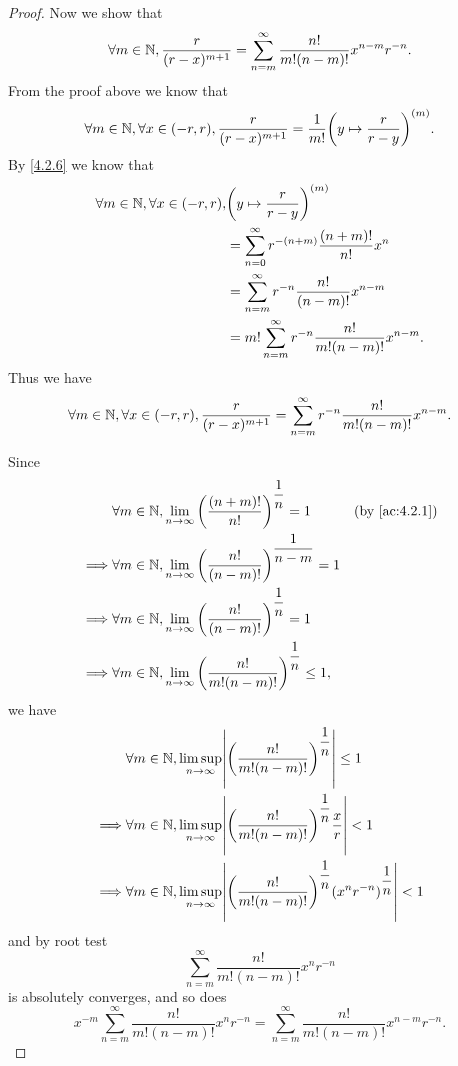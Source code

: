 \begin{proof}
  Now we show that
  \[
    \forall m \in \mathbb{N}, \dfrac{r}{(r - x)^{m + 1}} = \sum_{n = m}^\infty \dfrac{n!}{m! (n - m)!} x^{n - m} r^{-n}.
  \]
  From the proof above we know that
  \[
    \forall m \in \mathbb{N}, \forall x \in (-r, r), \dfrac{r}{(r - x)^{m + 1}} = \dfrac{1}{m!} \bigg(y \mapsto \dfrac{r}{r - y}\bigg)^{(m)}.
  \]
  By \cref{4.2.6} we know that
  \begin{align*}
    \forall m \in \mathbb{N}, \forall x \in (-r, r), & \bigg(y \mapsto \dfrac{r}{r - y}\bigg)^{(m)}                       \\
                                             & = \sum_{n = 0}^\infty r^{-(n + m)} \dfrac{(n + m)!}{n!} x^n        \\
                                             & = \sum_{n = m}^\infty r^{-n} \dfrac{n!}{(n - m)!} x^{n - m}        \\
                                             & = m! \sum_{n = m}^\infty r^{-n} \dfrac{n!}{m! (n - m)!} x^{n - m}.
  \end{align*}
  Thus we have
  \[
    \forall m \in \mathbb{N}, \forall x \in (-r, r), \dfrac{r}{(r - x)^{m + 1}} = \sum_{n = m}^\infty r^{-n} \dfrac{n!}{m! (n - m)!} x^{n - m}.
  \]

  Since
  \begin{align*}
             & \forall m \in \N, \lim_{n \to \infty} \bigg(\dfrac{(n + m)!}{n!}\bigg)^{\dfrac{1}{n}} = 1        &  & \text{(by \cref{ac:4.2.1})} \\
    \implies & \forall m \in \N, \lim_{n \to \infty} \bigg(\dfrac{n!}{(n - m)!}\bigg)^{\dfrac{1}{n - m}} = 1                                     \\
    \implies & \forall m \in \N, \lim_{n \to \infty} \bigg(\dfrac{n!}{(n - m)!}\bigg)^{\dfrac{1}{n}} = 1                                         \\
    \implies & \forall m \in \N, \lim_{n \to \infty} \bigg(\dfrac{n!}{m! (n - m)!}\bigg)^{\dfrac{1}{n}} \leq 1,
  \end{align*}
  we have
  \begin{align*}
             & \forall m \in \N, \limsup_{n \to \infty} \abs{\bigg(\dfrac{n!}{m! (n - m)!}\bigg)^{\dfrac{1}{n}}} \leq 1                          \\
    \implies & \forall m \in \N, \limsup_{n \to \infty} \abs{\bigg(\dfrac{n!}{m! (n - m)!}\bigg)^{\dfrac{1}{n}} \dfrac{x}{r}} < 1                \\
    \implies & \forall m \in \N, \limsup_{n \to \infty} \abs{\bigg(\dfrac{n!}{m! (n - m)!}\bigg)^{\dfrac{1}{n}} (x^n r^{-n})^{\dfrac{1}{n}}} < 1
  \end{align*}
  and by root test
  \[
    \sum_{n = m}^\infty \dfrac{n!}{m! (n - m)!} x^n r^{-n}
  \]
  is absolutely converges, and so does
  \[
    x^{-m} \sum_{n = m}^\infty \dfrac{n!}{m! (n - m)!} x^n r^{-n} = \sum_{n = m}^\infty \dfrac{n!}{m! (n - m)!} x^{n - m} r^{-n}.
  \]
\end{proof}

